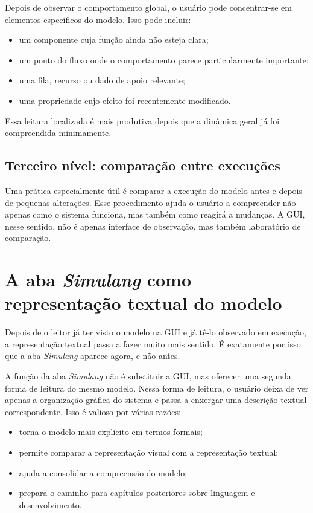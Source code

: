 Depois de observar o comportamento global, o usuário pode concentrar-se em elementos específicos do modelo. Isso pode incluir:
\begin{itemize}
    \item um componente cuja função ainda não esteja clara;
    \item um ponto do fluxo onde o comportamento parece particularmente importante;
    \item uma fila, recurso ou dado de apoio relevante;
    \item uma propriedade cujo efeito foi recentemente modificado.
\end{itemize}

Essa leitura localizada é mais produtiva depois que a dinâmica geral já foi compreendida minimamente.

\subsection{Terceiro nível: comparação entre execuções}
\label{subsec:cap5_terceiro_nivel_comparacao_execucoes}

Uma prática especialmente útil é comparar a execução do modelo antes e depois de pequenas alterações. Esse procedimento ajuda o usuário a compreender não apenas como o sistema funciona, mas também como reagirá a mudanças. A GUI, nesse sentido, não é apenas interface de observação, mas também laboratório de comparação.

\section{A aba \textit{Simulang} como representação textual do modelo}
\label{sec:cap5_aba_simulang}

Depois de o leitor já ter visto o modelo na GUI e já tê-lo observado em execução, a representação textual passa a fazer muito mais sentido. É exatamente por isso que a aba \textit{Simulang} aparece agora, e não antes.

A função da aba \textit{Simulang} não é substituir a GUI, mas oferecer uma segunda forma de leitura do mesmo modelo. Nessa forma de leitura, o usuário deixa de ver apenas a organização gráfica do sistema e passa a enxergar uma descrição textual correspondente. Isso é valioso por várias razões:

\begin{itemize}
    \item torna o modelo mais explícito em termos formais;
    \item permite comparar a representação visual com a representação textual;
    \item ajuda a consolidar a compreensão do modelo;
    \item prepara o caminho para capítulos posteriores sobre linguagem e desenvolvimento.
\end{itemize}

